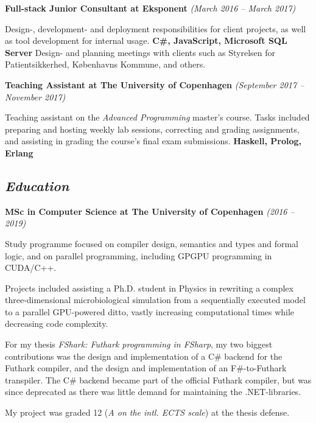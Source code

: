 \documentclass[10pt, a4paper]{article}
\begin{document}
\textbf{Full-stack Junior Consultant at Eksponent} \textit{(March 2016 -- March 2017)}
\begin{outline}
\1 Design-, development- and deployment responsibilities for client projects, as well as tool development for internal usage.\newline
  {\footnotesize \textbf{C\#, JavaScript, Microsoft SQL Server}}
\1 Design- and planning meetings with clients such as Styrelsen for Patientsikkerhed, Københavns Kommune, and others.
\end{outline}

\textbf{Teaching Assistant at The University of Copenhagen} \textit{(September 2017 -- November 2017)}
\begin{outline}
\1 Teaching assistant on the \textit{Advanced Programming} master's course. Tasks included preparing and hosting weekly lab sessions, correcting and grading assignments, and assisting in grading the course's final exam submissions.\newline
  {\footnotesize\textbf{Haskell, Prolog, Erlang}}
\end{outline}

\subsection*{\textit{Education}}
\textbf{MSc in Computer Science at The University of Copenhagen} \textit{(2016 -- 2019)}
\begin{outline}
  \1 Study programme focused on compiler design, semantics and types and formal logic, and on parallel programming, including GPGPU programming in CUDA/C++.

  \1 Projects included assisting a Ph.D. student in Physics in rewriting a complex three-dimensional microbiological simulation from a sequentially executed model to a parallel GPU-powered ditto, vastly increasing computational times while decreasing code complexity.
  
  \1 For my thesis \textit{FShark: Futhark programming in FSharp}, my two biggest contributions was the design and implementation of a C\# backend for the Futhark compiler, and the design and implementation of an F\#-to-Futhark transpiler. The C\# backend became part of the official Futhark compiler, but was since deprecated as there was little demand for maintaining the .NET-libraries.

  \1 My project was graded 12 (\textit{A on the intl. ECTS scale}) at the thesis defense.
\end{outline}
  
\end{document}
